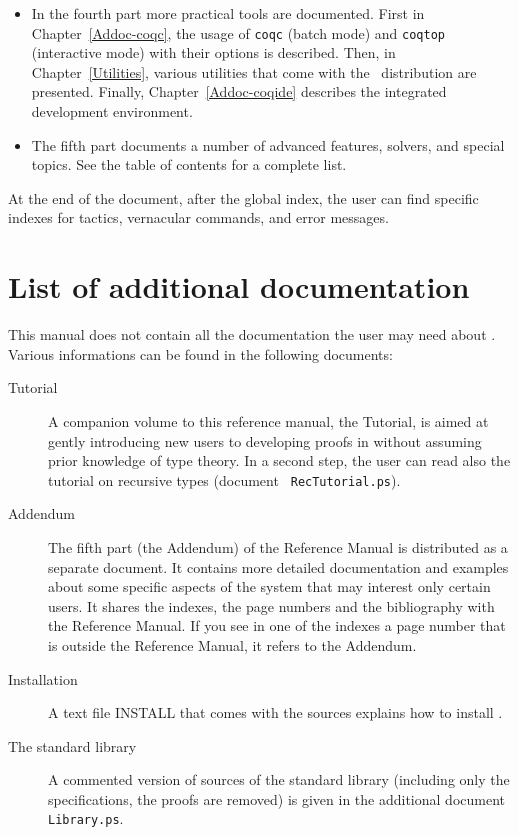 \begin{itemize}
\item In the fourth part more practical tools are documented. First in
  Chapter~\ref{Addoc-coqc}, the usage of \texttt{coqc} (batch mode)
  and \texttt{coqtop} (interactive mode) with their options is
  described. Then, in Chapter~\ref{Utilities},
  various utilities that come with the \Coq\ distribution are
  presented.
  Finally, Chapter~\ref{Addoc-coqide} describes the \Coq{} integrated
  development environment. 

\item The fifth part documents a number of advanced features, solvers, and
  special topics.  See the table of contents for a complete list.
\end{itemize}

At the end of the document, after the global index, the user can find
specific indexes for tactics, vernacular commands, and error
messages. 

\section*{List of additional documentation}

This manual does not contain all the documentation the user may need
about \Coq{}. Various informations can be found in the following
documents:  
\begin{description}

\item[Tutorial] 
  A companion volume to this reference manual, the \Coq{} Tutorial, is
  aimed at gently introducing new users to developing proofs in \Coq{}
  without assuming prior knowledge of type theory. In a second step, the
  user can read also the tutorial on recursive types (document {\tt
    RecTutorial.ps}).

\item[Addendum] The fifth part (the Addendum) of the Reference Manual
  is distributed as a separate document. It contains more
  detailed documentation and examples about some specific aspects of the
  system that may interest only certain users. It shares the indexes,
  the page numbers and
  the bibliography with the Reference Manual. If you see in one of the
  indexes a page number that is outside the Reference Manual, it refers
  to the Addendum. 

\item[Installation] A text file INSTALL that comes with the sources
  explains how to install \Coq{}.

\item[The \Coq{} standard library]
A commented version of sources of the \Coq{} standard library
(including only the specifications, the proofs are removed) 
is given in the additional document {\tt Library.ps}.

\end{description}


